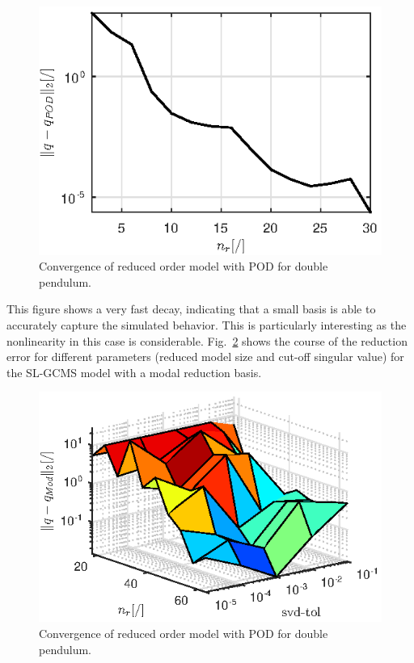 \begin{figure}[h!]
\centering
\includegraphics[scale=1]{DoublePendulumPODError.eps} 
\caption{Convergence of reduced order model with POD for double pendulum.}
\label{fig:DoublePendulumPODError}
\end{figure}
This figure shows a very fast decay, indicating that a small basis is able to accurately capture the simulated behavior. This is particularly interesting as the nonlinearity in this case is considerable.
Fig.~\ref{fig:DoublePendulumModalError} shows the course of the reduction error for different parameters (reduced model size and cut-off singular value) for the SL-GCMS model with a modal reduction basis. 
\begin{figure}[htp]
\centering
\includegraphics[bb= 0cm 0cm 10cm 5cm, clip,scale=1]{DoublePendulumModError.eps} 
\caption{Convergence of reduced order model with POD for double pendulum.}
\label{fig:DoublePendulumModalError}
\end{figure}
